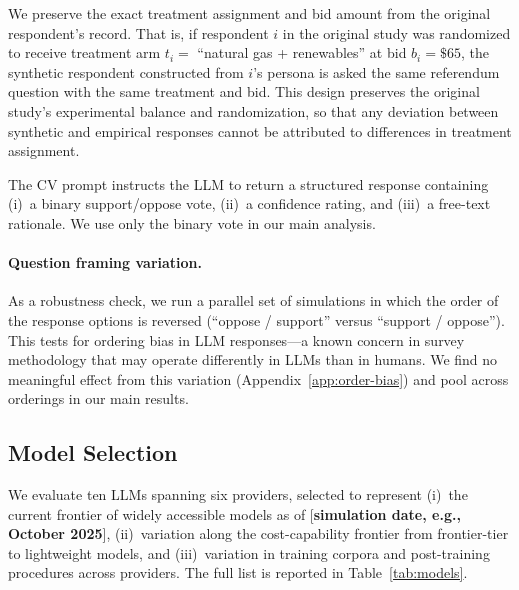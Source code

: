 \documentclass[12pt]{article}
\begin{document}
We preserve the exact treatment assignment and bid amount from the original
respondent's record. That is, if respondent $i$ in the original study was
randomized to receive treatment arm $t_i = $ ``natural gas + renewables''
at bid $b_i = \$65$, the synthetic respondent constructed from $i$'s
persona is asked the same referendum question with the same treatment and
bid. This design preserves the original study's experimental balance and
randomization, so that any deviation between synthetic and empirical
responses cannot be attributed to differences in treatment assignment.

The CV prompt instructs the LLM to return a structured response containing
(i)~a binary support/oppose vote, (ii)~a confidence rating, and (iii)~a
free-text rationale. We use only the binary vote in our main analysis.

\paragraph{Question framing variation.} As a robustness check, we run a
parallel set of simulations in which the order of the response options is
reversed (``oppose / support'' versus ``support / oppose''). This tests
for ordering bias in LLM responses---a known concern in survey methodology
that may operate differently in LLMs than in humans. We find no meaningful
effect from this variation (Appendix~\ref{app:order-bias}) and pool across
orderings in our main results.

\subsection{Model Selection}\label{sec:methods-models}

We evaluate ten LLMs spanning six providers, selected to represent (i)~the
current frontier of widely accessible models as of [\textbf{simulation
date, e.g., October 2025}], (ii)~variation along the cost-capability
frontier from frontier-tier to lightweight models, and (iii)~variation in
training corpora and post-training procedures across providers. The full
list is reported in Table~\ref{tab:models}.
\end{document}
